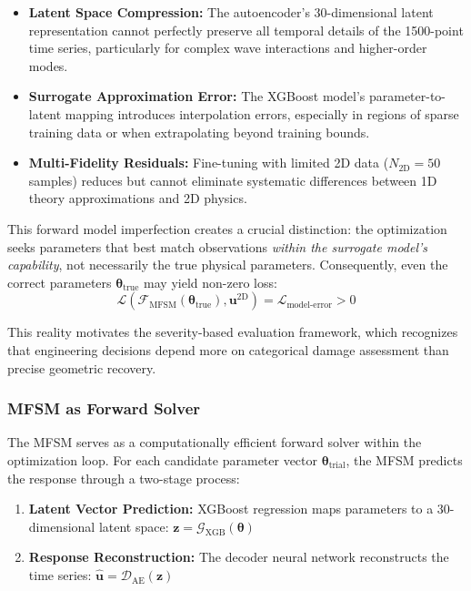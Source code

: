\documentclass[12pt,a4paper]{report}
\begin{document}
\begin{itemize}
    \item \textbf{Latent Space Compression:} The autoencoder's 30-dimensional latent representation cannot perfectly preserve all temporal details of the 1500-point time series, particularly for complex wave interactions and higher-order modes.

    \item \textbf{Surrogate Approximation Error:} The XGBoost model's parameter-to-latent mapping introduces interpolation errors, especially in regions of sparse training data or when extrapolating beyond training bounds.

    \item \textbf{Multi-Fidelity Residuals:} Fine-tuning with limited 2D data ($N_{\text{2D}} = 50$ samples) reduces but cannot eliminate systematic differences between 1D theory approximations and 2D physics.
\end{itemize}

This forward model imperfection creates a crucial distinction: the optimization seeks parameters that best match observations \textit{within the surrogate model's capability}, not necessarily the true physical parameters. Consequently, even the correct parameters $\boldsymbol{\theta}_{\text{true}}$ may yield non-zero loss:
\begin{equation}
\mathcal{L}\left(\mathcal{F}_{\text{MFSM}}(\boldsymbol{\theta}_{\text{true}}), \mathbf{u}^{\text{2D}}\right) = \mathcal{L}_{\text{model-error}} > 0
\label{eq:model_error_floor}
\end{equation}

This reality motivates the severity-based evaluation framework, which recognizes that engineering decisions depend more on categorical damage assessment than precise geometric recovery.

\subsubsection{MFSM as Forward Solver}

The MFSM serves as a computationally efficient forward solver within the optimization loop. For each candidate parameter vector $\boldsymbol{\theta}_{\text{trial}}$, the MFSM predicts the response through a two-stage process:

\begin{enumerate}
    \item \textbf{Latent Vector Prediction:} XGBoost regression maps parameters to a 30-dimensional latent space: $\mathbf{z} = \mathcal{G}_{\text{XGB}}(\boldsymbol{\theta})$

    \item \textbf{Response Reconstruction:} The decoder neural network reconstructs the time series: $\hat{\mathbf{u}} = \mathcal{D}_{\text{AE}}(\mathbf{z})$
\end{enumerate}
\end{document}
